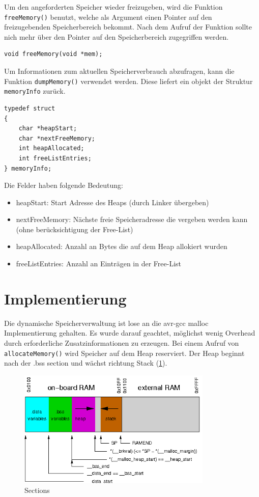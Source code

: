 \documentclass[fontsize=12pt, toc=bibliography, notitlepage]{scrreprt}
\begin{document}
Um den angeforderten Speicher wieder freizugeben, wird die Funktion \lstinline$freeMemory()$ benutzt, welche als Argument einen Pointer auf den freizugebenden  Speicherbereich bekommt. Nach dem Aufruf der Funktion sollte nich mehr über den Pointer auf den Speicherbereich zugegriffen werden.

\begin{lstlisting}[title=memory.h]
void freeMemory(void *mem);
\end{lstlisting}

Um Informationen zum aktuellen Speicherverbrauch abzufragen, kann die Funktion \lstinline$dumpMemory()$ verwendet werden. Diese liefert ein objekt der Struktur \lstinline$memoryInfo$ zurück.

\begin{lstlisting}[title=memory.h]
typedef struct
{
	char *heapStart;
	char *nextFreeMemory;
	int heapAllocated;
	int freeListEntries;
} memoryInfo;
\end{lstlisting}

Die Felder haben folgende Bedeutung:

\begin{itemize}
	\item heapStart: Start Adresse des Heaps (durch Linker übergeben)
	\item nextFreeMemory: Nächste freie Speicheradresse die vergeben werden kann (ohne berücksichtigung der Free-List)
	\item heapAllocated: Anzahl an Bytes die auf dem Heap allokiert wurden
	\item freeListEntries: Anzahl an Einträgen in der Free-List
\end{itemize}

\section{Implementierung}
\label{subsec:mem-impl}
Die dynamische Speicherverwaltung ist lose an die avr-gcc malloc Implementierung gehalten. Es wurde darauf geachtet, möglichst wenig Overhead durch erforderliche Zusatzinformationen zu erzeugen. Bei einem Aufruf von \lstinline$allocateMemory()$ wird Speicher auf dem Heap reserviert. Der Heap beginnt nach der .bss section und wächst richtung Stack (\ref{fig:sections}).

\begin{figure}[H]
	\centering
	\includegraphics[width=350px]{images/malloc-std.png}
	\caption{Sections}
	\label{fig:sections}
\end{figure}
\end{document}
